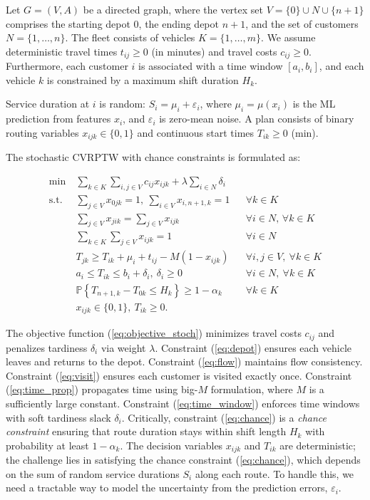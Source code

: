 \documentclass[preprint,12pt]{elsarticle}
\begin{document}
Let $G=(V,A)$ be a directed graph, where the vertex set $V=\{0\} \cup N \cup \{n+1\}$ comprises the starting depot $0$, the ending depot $n+1$, and the set of customers $N=\{1, \dots, n\}$. The fleet consists of vehicles $K=\{1, \dots, m\}$. We assume deterministic travel times $t_{ij} \ge 0$ (in minutes) and travel costs $c_{ij} \ge 0$. Furthermore, each customer $i$ is associated with a time window $[a_i, b_i]$, and each vehicle $k$ is constrained by a maximum shift duration $H_k$.

Service duration at $i$ is random: $S_i=\mu_i+\varepsilon_i$, where $\mu_i=\mu(x_i)$ is the ML prediction from features $x_i$, and $\varepsilon_i$ is zero-mean noise. A plan consists of binary routing variables $x_{ijk}\in\{0,1\}$ and continuous start times $T_{ik}\ge0$ (min).

The stochastic CVRPTW with chance constraints is formulated as:

\begin{align}
\min\ & \sum_{k\in K}\sum_{i,j\in V} c_{ij} x_{ijk}
      + \lambda \sum_{i\in N} \delta_i \label{eq:objective_stoch}\\
\text{s.t. }
& \sum_{j\in V} x_{0jk}=1,\ \sum_{i\in V} x_{i,n+1,k}=1 && \forall k\in K \label{eq:depot}\\
& \sum_{j\in V} x_{jik}=\sum_{j\in V} x_{ijk} && \forall i\in N,\,\forall k\in K \label{eq:flow}\\
& \sum_{k\in K}\sum_{j\in V} x_{ijk}=1 && \forall i\in N \label{eq:visit}\\
& T_{jk} \ge T_{ik} + \mu_i + t_{ij} - M(1-x_{ijk}) && \forall i,j\in V,\ \forall k\in K \label{eq:time_prop}\\
& a_i \le T_{ik} \le b_i + \delta_i,\ \delta_i\ge0 && \forall i\in N,\ \forall k\in K \label{eq:time_window}\\
& \mathbb{P}\!\left\{T_{n+1,k}-T_{0k} \le H_k\right\} \ge 1-\alpha_k && \forall k\in K \label{eq:chance}\\
& x_{ijk}\in\{0,1\},\ T_{ik}\ge0. \label{eq:binary}
\end{align}

The objective function (\ref{eq:objective_stoch}) minimizes travel costs $c_{ij}$ and penalizes tardiness $\delta_i$ via weight $\lambda$. Constraint (\ref{eq:depot}) ensures each vehicle leaves and returns to the depot. Constraint (\ref{eq:flow}) maintains flow consistency. Constraint (\ref{eq:visit}) ensures each customer is visited exactly once. Constraint (\ref{eq:time_prop}) propagates time using big-$M$ formulation, where $M$ is a sufficiently large constant. Constraint (\ref{eq:time_window}) enforces time windows with soft tardiness slack $\delta_i$. Critically, constraint (\ref{eq:chance}) is a \emph{chance constraint} ensuring that route duration stays within shift length $H_k$ with probability at least $1-\alpha_k$. The decision variables $x_{ijk}$ and $T_{ik}$ are deterministic; the challenge lies in satisfying the chance constraint (\ref{eq:chance}), which depends on the sum of random service durations $S_i$ along each route. To handle this, we need a tractable way to model the uncertainty from the prediction errors, $\varepsilon_i$.
\end{document}
